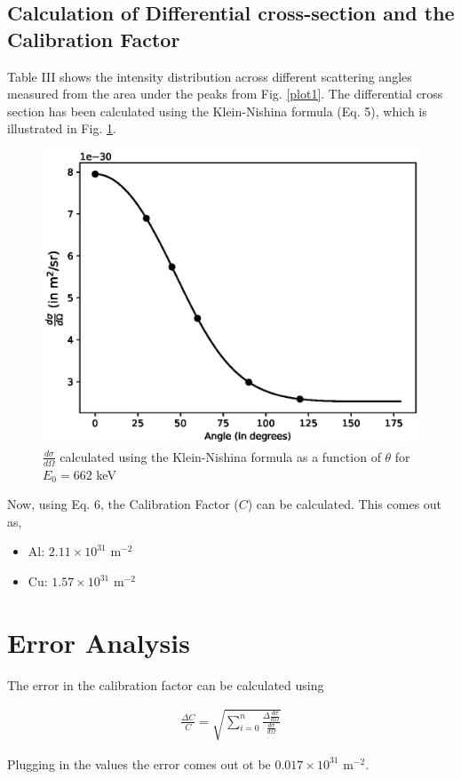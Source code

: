 \subsection{Calculation of Differential cross-section and the Calibration Factor}

Table III shows the intensity distribution across different scattering angles measured from the area under the peaks from Fig. \ref{plot1}. The differential cross section has been calculated using the Klein-Nishina formula (Eq. 5), which is illustrated in Fig. \ref{cross-sec}.\\

\begin{figure}[H]
    \centering
    \includegraphics[width=1\columnwidth]{images/cross-section.eps}
    \caption{$\frac{d\sigma}{d\Omega}$ calculated using the Klein-Nishina formula as a function of $\theta$ for $E_0 = 662$ keV}
    \label{cross-sec}
\end{figure}



Now, using Eq. 6, the Calibration Factor ($C$) can be calculated. This comes out as,

\begin{itemize}
    \item Al: $2.11\times 10^{31}$ m$^{-2}$
    \item Cu: $1.57 \times 10^{31}$ m$^{-2}$
\end{itemize}

\section{Error Analysis}

The error in the calibration factor can be calculated using

\begin{align}
    \frac{\Delta C}{C} = \sqrt{\sum_{i=0}^n \frac{\Delta \frac{d\sigma}{d\Omega}}{\frac{d\sigma}{d\Omega}}}
\end{align}

Plugging in the values the error comes out ot be $0.017 \times 10^{31}$ m$^{-2}$.